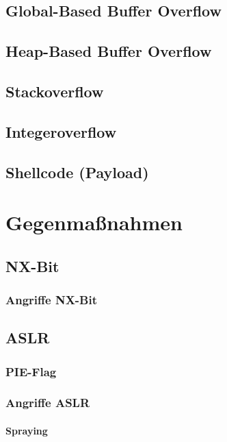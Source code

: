 \documentclass[12pt]{book}
\begin{document}
\section{Global-Based Buffer Overflow}

\section{Heap-Based Buffer Overflow}

\section{Stackoverflow}

\section{Integeroverflow}

\section{Shellcode (Payload)}

\chapter{Gegenmaßnahmen}

\section{NX-Bit}

\subsection{Angriffe NX-Bit}

\section{ASLR}

\subsection{PIE-Flag}

\subsection{Angriffe ASLR}

\subsubsection{Spraying}
\end{document}
